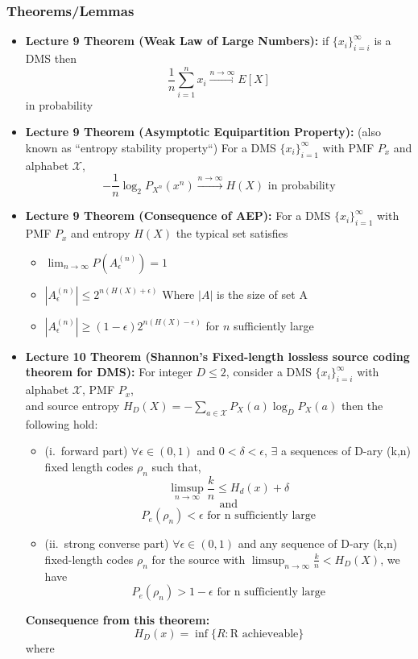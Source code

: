 \documentclass{article}
\begin{document}
\subsubsection{Theorems/Lemmas}
\begin{itemize}
    \item \textbf{Lecture 9 Theorem (Weak Law of Large Numbers):} if \(\{x_i\}^{\infty}_{i=i}\) is a DMS then 
\[\frac{1}{n} \sum^n_{i=1} x_i \xrightarrow{n\to\infty} E[X]\] in probability
    \item \textbf{Lecture 9 Theorem (Asymptotic Equipartition Property):} (also known as ``entropy stability property``)
    For a DMS \(\{x_i\}^\infty_{i=1}\) with PMF \(P_x\) and alphabet \(\mathcal{X}\),
    \[-\frac{1}{n} \log_2 P_{X^n}(x^n) \xrightarrow[]{n\to\infty}H(X) \text{ in probability}\]
    \item \textbf{Lecture 9 Theorem (Consequence of AEP):} For a DMS \(\{x_i\}_{i=1}^\infty\) with PMF \(P_x\) and entropy \(H(X)\) the typical set satisfies
    \begin{itemize}
        \item \(\lim_{n\to\infty} P(A_{\epsilon}^{(n)})=1\)
        \item \(|A_\epsilon^{(n)}| \leq 2^{n(H(X)+\epsilon)}\) Where \(|A|\) is the size of set A
        \item \(|A_\epsilon^{(n)}| \geq (1-\epsilon)2^{n(H(X)-\epsilon)}\) for \(n\) sufficiently large
    \end{itemize}
    \item \textbf{Lecture 10 Theorem (Shannon's Fixed-length lossless source coding theorem for DMS):} For integer \(D\leq2\), consider a DMS \(\{x_i\}^{\infty}_{i=i}\) with alphabet \(\mathcal{X}\), PMF \(P_x\), \\and
    source entropy \(H_D(X) = - \sum_{a \in \mathcal{X}} P_X(a) \log_D P_X(a)\) then the following hold:
    \begin{itemize}
        \item (i.\ forward part) \(\forall \epsilon \in (0,1)\) and \(0<\delta<\epsilon\), \(\exists\) a sequences of D-ary (k,n) fixed length codes \(\rho_n\) such that,
        \[\limsup_{n\to\infty}\frac{k}{n} \leq H_d(x) + \delta\] 
        \[\text{ and } \]
        \[P_e(\rho_n)< \epsilon \text{ for n sufficiently large}\]
        
        \item (ii.\ strong converse part) \(\forall \epsilon \in (0,1)\) and any sequence of D-ary (k,n) fixed-length codes \(\rho_n\) for the source with \(\limsup_{n\to\infty}\frac{k}{n}<H_D(X)\), we have
        \[P_e(\rho_n)>1-\epsilon \text{ for n sufficiently large}\]
    \end{itemize}
    \textbf{Consequence from this theorem:}
    \[H_D(x) = \inf \{R: \text{R achieveable}\}\]
    where
    


\end{itemize}
\end{document}
